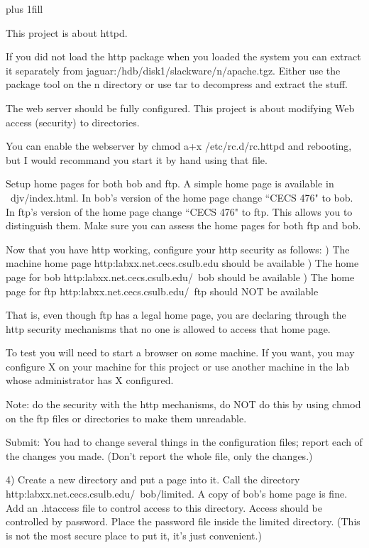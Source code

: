 
\rightskip=0pt plus 1fill

\parindent 0pt

This project is about httpd.

If you did not load the http package when you loaded the system you can
extract it separately from
{\ltt{}jaguar:/hdb/disk1/slackware/n/apache.tgz}.
Either use the package tool on the n directory or 
use tar to decompress and extract the stuff.

The web server should be fully configured.
This project is about modifying Web access (security) to
directories.

You can enable the webserver by 
{\ltt{}chmod a+x /etc/rc.d/rc.httpd}
and rebooting,
but I would recommand you start it by hand using that file.

Setup home pages for both bob and ftp.
A simple home page is available in {\ltt{}~djv/index.html}.
In bob's version of the home page change ``CECS 476" to bob.
In ftp's version of the home page change ``CECS 476" to ftp.
This allows you to distinguish them.
Make sure you can assess the home pages for both ftp and bob.

Now that you have http working,
configure your http security as follows:
\hfill{}) The machine home page {\ltt{}http:labxx.net.cecs.csulb.edu}
should be available
\hfill{}) The home page for bob {\ltt{}http:labxx.net.cecs.csulb.edu/~bob}
should be available
\hfill{}) The home page for ftp {\ltt{}http:labxx.net.cecs.csulb.edu/~ftp}
should NOT be available

That is, even though ftp has a legal home page, you are declaring
through the http security mechanisms that no one is allowed to
access that home page.

To test you will need to start a browser on some machine. 
If you want, you may configure X on your machine for this project or use 
another machine in the lab whose administrator has X configured.

Note: do the security with the http mechanisms, do NOT do
this by using
{\ltt{}chmod} on the ftp files or directories to make them unreadable.

Submit: 
You had to change several things in the configuration files;
report each of the changes you made.
(Don't report the whole file, only the changes.)

4) Create a new directory and put a page into it.
Call the directory
{\ltt{}http:labxx.net.cecs.csulb.edu/~bob/limited}.
A copy of bob's home page is fine.
Add an {\ltt{}.htaccess} file to control access to this directory.
Access should be controlled by password.
Place the password file inside the {\ltt{}limited} directory.
(This is not the most secure place to put it, it's just convenient.)

